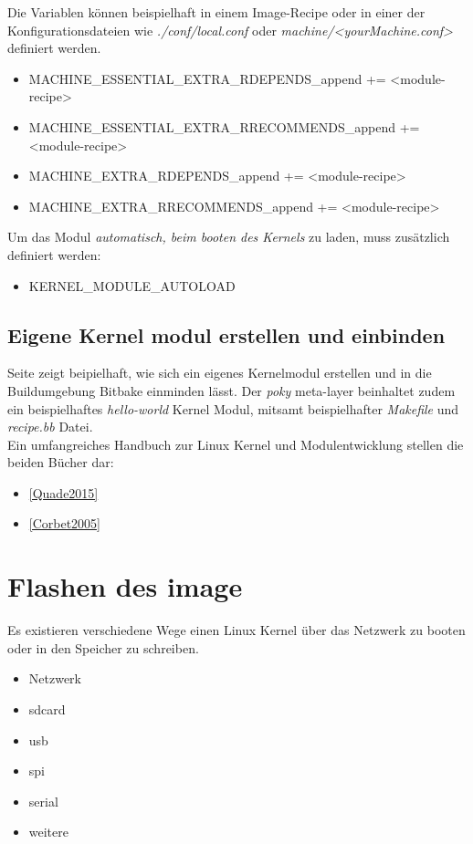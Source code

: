 Die Variablen können beispielhaft in einem Image-Recipe oder in einer der
Konfigurationsdateien wie \textit{./conf/local.conf} oder
\textit{machine/<yourMachine.conf>}  definiert werden.

\begin{itemize}
    \item MACHINE\_ESSENTIAL\_EXTRA\_RDEPENDS\_append +=  <module-recipe>
    \item MACHINE\_ESSENTIAL\_EXTRA\_RRECOMMENDS\_append += <module-recipe>
    \item MACHINE\_EXTRA\_RDEPENDS\_append += <module-recipe>
    \item MACHINE\_EXTRA\_RRECOMMENDS\_append += <module-recipe>
\end{itemize}

Um das Modul \textit{automatisch, beim booten des Kernels} zu laden, muss
zusätzlich definiert werden:

\begin{itemize}
    \item KERNEL\_MODULE\_AUTOLOAD
\end{itemize}


\subsection{Eigene Kernel modul erstellen und einbinden}%
\label{sub:eigene_kernel_modul_erstellen_und_einbinden}


Seite \cite[121-125]{Gonzalez2018:Embedded_Linux_Development_Using_Yocto_Project_Cookbook_2nd}
zeigt beipielhaft, wie sich ein eigenes Kernelmodul erstellen und in die
Buildumgebung Bitbake einminden lässt. Der \textit{poky} meta-layer beinhaltet
zudem ein beispielhaftes \textit{hello-world} Kernel Modul, mitsamt
beispielhafter \textit{Makefile} und \textit{recipe.bb} Datei.
\\
Ein umfangreiches Handbuch zur Linux Kernel und Modulentwicklung stellen die
beiden Bücher dar:
\begin{itemize}
    \item \ref{Quade2015}
    \item \ref{Corbet2005}
\end{itemize}










\section{Flashen des image}%
\label{sec:flashen_des_image}

Es existieren verschiedene Wege einen Linux Kernel über das Netzwerk zu booten
oder in den Speicher zu schreiben.

\begin{itemize}
    \item Netzwerk
    \item sdcard
    \item usb
    \item spi
    \item serial
    \item weitere
\end{itemize}
















